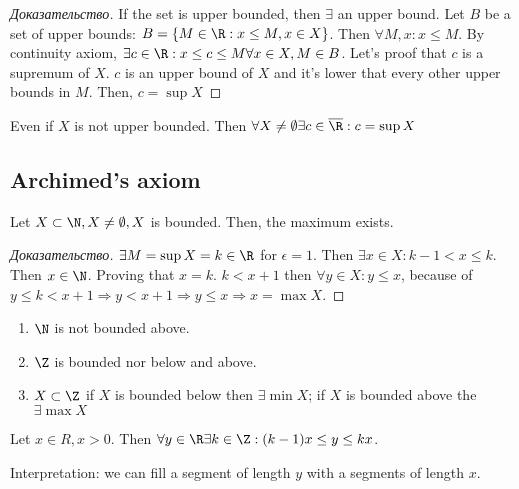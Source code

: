 \begin{proof}[Доказательство]
	If the set is upper bounded, then $\exists $ an upper bound. Let $B$ be a set of upper bounds: $B = \left\{ M \in \R: x \leq M, x \in X \right \} $. Then $\forall M, x: x \leq M$. By continuity axiom, $\exists c \in \R: x \leq c \leq M \forall x \in X, M \in B$. Let's proof that $c$ is a supremum of $X$.  $c$ is an upper bound of $X$ and it's lower that every other upper bounds in  $M$. Then, $c = \sup X$
\end{proof}

\begin{note}[]
	Even if $X$ is not upper bounded. Then $\forall X \neq \emptyset \exists c \in \overline{\R}: c = \sup X$
\end{note}

\subsection{Archimed's axiom}

\begin{lemma}
	Let $X \subset  \N, X \neq \emptyset, X$ is bounded. Then, the maximum exists.
\end{lemma}

\begin{proof}[Доказательство]
	$\exists M = \sup X = k \in \R$ for $\epsilon = 1$. Then  $\exists x \in X: k-1 < x \leq k$. Then $x \in \N$. Proving that $x = k$. $k < x + 1$ then  $\forall y \in X: y \leq x$, because of $y \leq k < x+1 \Rightarrow y < x+1 \Rightarrow y \leq x \Rightarrow x = \max X$.
\end{proof}

\begin{corollary}[]
	\begin{enumerate}
		\item $\N$ is not bounded above.
		\item $\Z$ is bounded nor below and above. 
		\item $X \subset \Z$ if  $X$ is bounded below then $\exists \min X$; if $X$ is bounded above the $\exists \max X$  
	\end{enumerate}
\end{corollary}

\begin{theorem}
	Let $x \in R, x > 0$. Then $\forall y \in \R \exists k \in \Z: (k-1)x \leq y \leq kx$. 

	Interpretation: we can fill a segment of length $y$ with a segments of length $x$.
\end{theorem}

